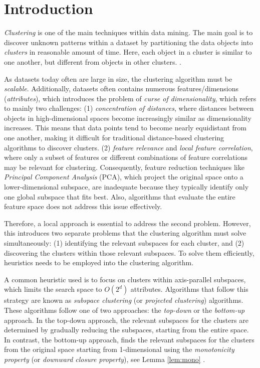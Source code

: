 \section{Introduction}
\textit{Clustering} is one of the main techniques within data mining. The main goal is to discover unknown patterns within a dataset by partitioning the data objects into \textit{clusters} in reasonable amount of time. Here, each object in a cluster is similar to one another, but different from objects in other clusters. \cite[p.~444]{han-2011}.

As datasets today often are large in size, the clustering algorithm must be \textit{scalable}. Additionally, datasets often contains numerous features/dimensions (\textit{attributes}), which introduces the problem of \textit{curse of dimensionality}, which refers to mainly two challenges: (1) \textit{concentration of distances}, where distances between objects in high-dimensional spaces become increasingly similar as dimensionality increases. This means that data points tend to become nearly equidistant from one another, making it difficult for traditional distance-based clustering algorithms to discover clusters. (2) \textit{feature relevance} and \textit{local feature correlation}, where only a subset of features or different combinations of feature correlations may be relevant for clustering. Consequently, feature reduction techniques like \textit{Principal Component Analysis} (PCA), which project the original space onto a lower-dimensional subspace, are inadequate because they typically identify only one global subspace that fits best. Also, algorithms that evaluate the entire feature space does not address this issue effectively. \cite[p.~43--46]{kriegel-2009}

Therefore, a local approach is essential to address the second problem. However, this introduces two separate problems that the clustering algorithm must solve simultaneously: (1) identifying the relevant subspaces for each cluster, and (2) discovering the clusters within those relevant subspaces. To solve them efficiently, heuristics needs to be employed into the clustering algorithm. \cite[p.~6--7]{kriegel-2009}

A common heuristic used is to focus on clusters within axis-parallel subspaces, which limits the search space to $O(2^d)$ attributes. Algorithms that follow this strategy are known as \textit{subspace clustering} (or \textit{projected clustering}) algorithms. These algorithms follow one of two approaches: the \textit{top-down} or the \textit{bottom-up} approach. In the top-down approach, the relevant subspaces for the clusters are determined by gradually reducing the subspaces, starting from the entire space. In contrast, the bottom-up approach, finds the relevant subspaces for the clusters from the original space starting from 1-dimensional using the \textit{monotonicity property} (or \textit{downward closure property}), see Lemma \ref{lem:mono} \cite{clique}. \cite[p.~8,~11]{kriegel-2009}

